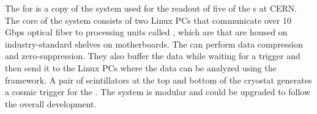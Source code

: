 The  for  is a copy of the system used for the readout
of five of the  s at CERN. The core of the  system 
consists of two Linux PCs that communicate over 10 Gbps optical fiber
to processing units called , which are  that are
housed on industry-standard  shelves on  motherboards.
The  can perform data compression and zero-suppression. They also buffer
the data while waiting for a trigger and then send it to the Linux PCs where the data can
be analyzed using the  framework. A pair of scintillators at the top and
bottom of the cryostat generates a cosmic trigger for the .
The system is modular and could be upgraded to follow the overall   
development. 


